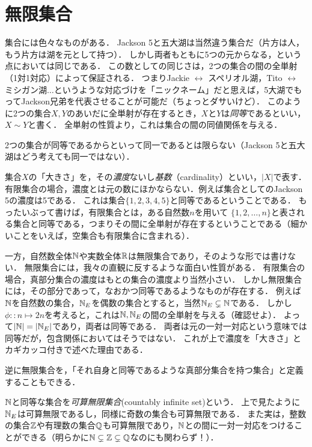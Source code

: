 \documentclass[11pt,a4paper]{bxjsarticle}
\begin{document}
\section{無限集合}
集合には色々なものがある．
Jackson 5と五大湖は当然違う集合だ（片方は人，もう片方は湖を元として持つ）．
しかし両者もともに5つの元からなる，という点においては同じである．
この数としての同じさは，2つの集合の間の全単射（1対1対応）によって保証される．
つまりJackie $\leftrightarrow$ スペリオル湖，Tito $\leftrightarrow$ ミシガン湖$\dots$というような対応づけを「ニックネーム」だと思えば，5大湖でもってJackson兄弟を代表させることが可能だ（ちょっとダサいけど）．
このように2つの集合$X, Y$のあいだに全単射が存在するとき，$X$と$Y$は\emph{同等}であるといい，$X \sim Y$と書く．
全単射の性質より，これは集合の間の同値関係を与える．

\begin{attn}
 2つの集合が同等であるからといって同一であるとは限らない（Jackson 5と五大湖はどう考えても同一ではない）．
\end{attn}

集合$X$の「大きさ」を，その\emph{濃度}ないし\emph{基数}（cardinality）といい，$|X|$で表す．
有限集合の場合，濃度とは元の数にほかならない．例えば集合としてのJackson 5の濃度は5である．
これは集合$\{1, 2, 3, 4, 5\}$と同等であるということである．
もったいぶって書けば，有限集合とは，ある自然数$n$を用いて $\{1, 2, \dots, n\}$と表される集合と同等である，つまりその間に全単射が存在するということである（細かいことをいえば，空集合も有限集合に含まれる）．

一方，自然数全体$\mathbb{N}$や実数全体$\mathbb{R}$は無限集合であり，そのような形では書けない．
無限集合には，我々の直観に反するような面白い性質がある．
有限集合の場合，真部分集合の濃度はもとの集合の濃度より当然小さい．
しかし無限集合には，その部分であって，なおかつ同等であるようなものが存在する．
例えば$\mathbb{N}$を自然数の集合，$\mathbb{N}_E$を偶数の集合とすると，当然$\mathbb{N}_E \subsetneq \mathbb{N}$である．
しかし$\phi::n \mapsto 2n$を考えると，これは$\mathbb{N}, \mathbb{N}_E$の間の全単射を与える（確認せよ）．
よって$|\mathbb{N}| = |\mathbb{N}_E|$であり，両者は同等である．
両者は元の一対一対応という意味では同等だが，包含関係においてはそうではない．
これが上で濃度を「大きさ」とカギカッコ付きで述べた理由である．

逆に無限集合を，「それ自身と同等であるような真部分集合を持つ集合」と定義することもできる．

$\mathbb{N}$と同等な集合を\emph{可算無限集合}(countably infinite set)という．
上で見たように$\mathbb{N}_E$は可算無限であるし，同様に奇数の集合も可算無限である．
また実は，整数の集合$\mathbb{Z}$や有理数の集合$\mathbb{Q}$も可算無限であり，$\mathbb{N}$との間に一対一対応をつけることができる（明らかに$\mathbb{N} \subsetneq \mathbb{Z} \subsetneq \mathbb{Q}$なのにも関わらず！）．
\end{document}

